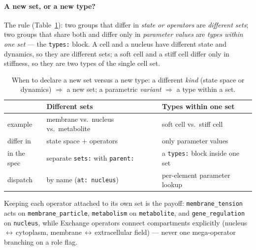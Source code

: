 \documentclass[11pt]{article}
\newcommand{\code}[1]{\texttt{#1}}
\begin{document}
\paragraph{A new set, or a new type?} The rule (Table~\ref{tab:sorts}): two groups
that differ in \emph{state or operators} are \emph{different sets}; two groups that
share both and differ only in \emph{parameter values} are \emph{types within one
set} --- the \code{types:} block. A cell and a nucleus have different state and
dynamics, so they are different sets; a soft cell and a stiff cell differ only in
stiffness, so they are two types of the single cell set.

\begin{table}[h]
\centering\footnotesize
\renewcommand{\arraystretch}{1.3}
\begin{tabular}{@{}l p{5.1cm} p{5.1cm}@{}}
\toprule
 & \textbf{Different sets} & \textbf{Types within one set} \\
\midrule
example     & membrane vs.\ nucleus vs.\ metabolite      & soft cell vs.\ stiff cell \\
differ in   & state space $+$ operators                  & only parameter values \\
in the spec & separate \code{sets:} with \code{parent:}   & a \code{types:} block inside one set \\
dispatch    & by name (\code{at: nucleus})               & per-element parameter lookup \\
\bottomrule
\end{tabular}
\caption{When to declare a new set versus a new type: a different \emph{kind}
(state space or dynamics) $\Rightarrow$ a new set; a parametric \emph{variant}
$\Rightarrow$ a type within a set.}
\label{tab:sorts}
\end{table}

Keeping each operator attached to its own set is the payoff: \code{membrane\_tension}
acts on \code{membrane\_particle}, \code{metabolism} on \code{metabolite}, and
\code{gene\_regulation} on \code{nucleus}, while Exchange operators connect
compartments explicitly (nucleus\,$\leftrightarrow$\,cytoplasm,
membrane\,$\leftrightarrow$\,extracellular field) --- never one mega-operator
branching on a role flag.
\end{document}
